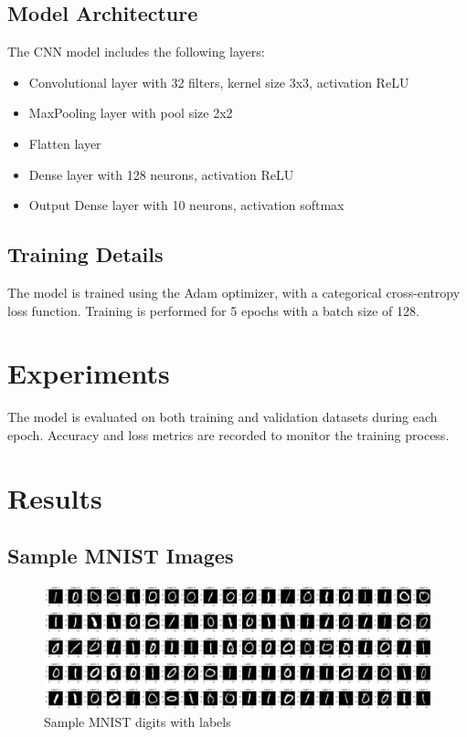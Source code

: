 \documentclass[12pt]{article}
\begin{document}
\subsection{Model Architecture}
The CNN model includes the following layers:
\begin{itemize}
    \item Convolutional layer with 32 filters, kernel size 3x3, activation ReLU
    \item MaxPooling layer with pool size 2x2
    \item Flatten layer
    \item Dense layer with 128 neurons, activation ReLU
    \item Output Dense layer with 10 neurons, activation softmax
\end{itemize}

\subsection{Training Details}
The model is trained using the Adam optimizer, with a categorical cross-entropy loss function. Training is performed for 5 epochs with a batch size of 128.

\section{Experiments}
The model is evaluated on both training and validation datasets during each epoch. Accuracy and loss metrics are recorded to monitor the training process.

\section{Results}

\subsection{Sample MNIST Images}
\begin{figure}[H]
    \centering
    \includegraphics[width=\textwidth]{output2.png}
    \caption{Sample MNIST digits with labels}
\end{figure}
\end{document}
